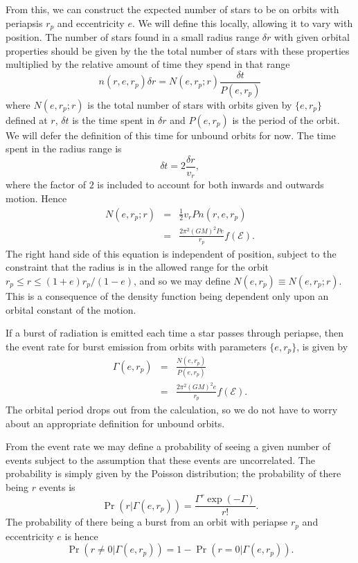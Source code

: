 \documentclass[useAMS,usenatbib]{mn2e}
\newcommand{\recip}[1]{\ensuremath{\frac{1}{#1}}}
\begin{document}
From this, we can construct the expected number of stars to be on orbits with periapsis $r_p$ and eccentricity $e$. We will define this locally, allowing it to vary with position. The number of stars found in a small radius range $\delta r$ with given orbital properties should be given by the the total number of stars with these properties multiplied by the relative amount of time they spend in that range
\begin{equation}
n(r, e, r_p)\delta r = N(e, r_p; r)\frac{\delta t}{P(e, r_p)}
\end{equation}
where $N(e, r_p; r)$ is the total number of stars with orbits given by $\{e, r_p\}$ defined at $r$, $\delta t$ is the time spent in $\delta r$ and $P(e, r_p)$ is the period of the orbit. We will defer the definition of this time for unbound orbits for now. The time spent in the radius range is
\begin{equation}
\delta t = 2\frac{\delta r}{v_r},
\end{equation}
where the factor of $2$ is included to account for both inwards and outwards motion. Hence
\begin{eqnarray}
N(e, r_p; r) & = & \recip{2} v_r P n(r, e, r_p)\\
 & = & \frac{2\pi^2(GM)^2 P e}{r_p}f(\mathcal{E}).
\end{eqnarray}
The right hand side of this equation is independent of position, subject to the constraint that the radius is in the allowed range for the orbit $r_p \leq r \leq (1+e)r_p/(1-e)$, and so we may define $N(e, r_p) \equiv N(e, r_p; r)$. This is a consequence of the density function being dependent only upon an orbital constant of the motion.

If a burst of radiation is emitted each time a star passes through periapse, then the event rate for burst emission from orbits with parameters $\{e, r_p\}$, is given by
\begin{eqnarray}
\Gamma(e, r_p) & = & \frac{N(e, r_p)}{P(e, r_p)}\\
 & = & \frac{2\pi^2(GM)^2 e}{r_p}f(\mathcal{E}).
\label{eq:Gamma}
\end{eqnarray}
The orbital period drops out from the calculation, so we do not have to worry about an appropriate definition for unbound orbits.

From the event rate we may define a probability of seeing a given number of events subject to the assumption that these events are uncorrelated. The probability is simply given by the Poisson distribution; the probability of there being $r$ events is
\begin{equation}
\Pr(r|\Gamma(e, r_p)) = \frac{\Gamma^r\exp(-\Gamma)}{r!}.
\end{equation}
The probability of there being a burst from an orbit with periapse $r_p$ and eccentricity $e$ is hence
\begin{equation}
\Pr(r \neq 0|\Gamma(e, r_p)) = 1 - \Pr(r = 0|\Gamma(e, r_p)).
\end{equation}
\end{document}
